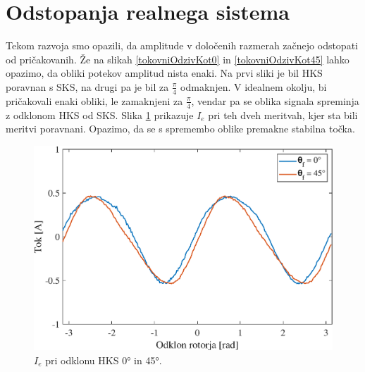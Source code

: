 \documentclass[a4paper,twoside,openright,12pt,slovene]{book}
\begin{document}
\section{Odstopanja realnega sistema}

Tekom razvoja smo opazili, da amplitude v določenih razmerah začnejo odstopati od pričakovanih. Že na slikah \ref{tokovniOdzivKot0} in \ref{tokovniOdzivKot45} lahko opazimo, da obliki potekov amplitud
nista enaki. Na prvi sliki je bil HKS poravnan s SKS, na drugi pa je bil za $\frac{\pi}{4}$ odmaknjen. V idealnem okolju, bi pričakovali enaki obliki, le zamaknjeni za $\frac{\pi}{4}$, vendar pa se
oblika signala spreminja z odklonom HKS od SKS. Slika \ref{reguliranaVelicinaIdq0in45} prikazuje $I_e$ pri teh dveh meritvah, kjer sta bili meritvi poravnani. Opazimo, da se s spremembo oblike
premakne stabilna točka.

\begin{figure}[!htbp]
    \centering
    \includegraphics[width=1\columnwidth]{Slike/reguliranaVelicinaIdq0in45.eps}
    \caption{\label{reguliranaVelicinaIdq0in45} $I_e$ pri odklonu HKS 0° in 45°.}
\end{figure}
\end{document}
